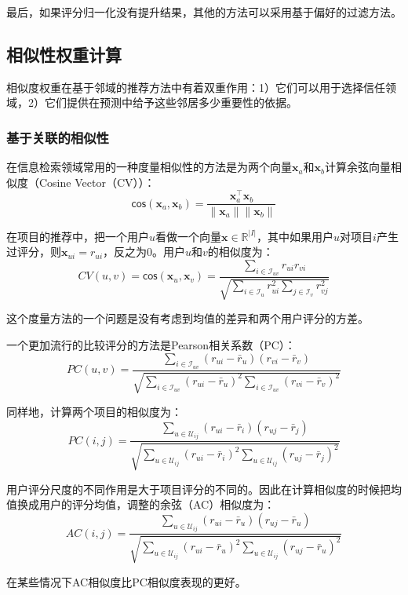\documentclass{article}
\begin{document}
 最后，如果评分归一化没有提升结果，其他的方法可以采用基于偏好的过滤方法。

 \subsection{相似性权重计算}
 相似度权重在基于邻域的推荐方法中有着双重作用：1）它们可以用于选择信任领域，2）它们提供在预测中给予这些邻居多少重要性的依据。

 \subsubsection{基于关联的相似性}
 在信息检索领域常用的一种度量相似性的方法是为两个向量$\mathbf{x}_a$和$\mathbf{x}_b$计算余弦向量相似度（Cosine Vector（CV））：
 $$ \mathsf{cos}(\mathbf{x}_a,\mathbf{x}_b)=\frac{\mathbf{x}_a^{\top}\mathbf{x}_b}{\|\mathbf{x}_a\|\|\mathbf{x}_b\|} $$

 在项目的推荐中，把一个用户$u$看做一个向量$\mathbf{x}\in\mathbb{R}^{|I|}$，其中如果用户$u$对项目$i$产生过评分，则$\mathbf{x}_{ui}=r_{ui}$，反之为0。用户$u$和$v$的相似度为：
 $$ CV(u,v)=\mathsf{cos}(\mathbf{x}_{u},\mathbf{x}_{v})=\frac{\mathop{\sum}\limits_{i\in\mathcal{I}_{uv}}r_{ui}r_{vi}}{\sqrt{\mathop{\sum}\limits_{i\in\mathcal{I}_{u}}r_{ui}^2\mathop{\sum}\limits_{j\in\mathcal{I}_{v}}r_{vj}^2}} $$

 这个度量方法的一个问题是没有考虑到均值的差异和两个用户评分的方差。

 一个更加流行的比较评分的方法是Pearson相关系数（PC）：
 $$ PC(u,v)=\frac{\mathop{\sum}\limits_{i\in\mathcal{I}_{uv}}(r_{ui}-\bar{r}_{u})(r_{vi}-\bar{r}_{v})}{\sqrt{\mathop{\sum}\limits_{i\in\mathcal{I}_{uv}}(r_{ui}-\bar{r}_{u})^2\mathop{\sum}\limits_{i\in\mathcal{I}_{uv}}(r_{vi}-\bar{r}_{v})^2}} $$

 同样地，计算两个项目的相似度为：
 $$ PC(i,j)=\frac{\mathop{\sum}\limits_{u\in\mathcal{U}_{ij}}(r_{ui}-\bar{r}_{i})(r_{uj}-\bar{r}_{j})}{\sqrt{\mathop{\sum}\limits_{u\in\mathcal{U}_{ij}}(r_{ui}-\bar{r}_{i})^2\mathop{\sum}\limits_{u\in\mathcal{U}_{ij}}(r_{uj}-\bar{r}_{j})^2}} $$

 用户评分尺度的不同作用是大于项目评分的不同的。因此在计算相似度的时候把均值换成用户的评分均值，调整的余弦（AC）相似度为：
 $$ AC(i,j)=\frac{\mathop{\sum}\limits_{u\in\mathcal{U}_{ij}}(r_{ui}-\bar{r}_{u})(r_{uj}-\bar{r}_{u})}{\sqrt{\mathop{\sum}\limits_{u\in\mathcal{U}_{ij}}(r_{ui}-\bar{r}_{u})^2\mathop{\sum}\limits_{u\in\mathcal{U}_{ij}}(r_{uj}-\bar{r}_{u})^2}} $$

 在某些情况下AC相似度比PC相似度表现的更好。
\end{document}
